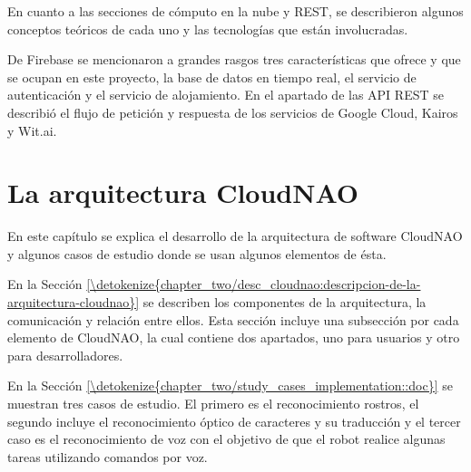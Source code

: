 \documentclass[letterpaper,12pt,spanish]{report}
\begin{document}
En cuanto a las secciones de cómputo en la nube
y REST, se describieron algunos conceptos teóricos
de cada uno y las tecnologías que están involucradas.

De Firebase se mencionaron a grandes rasgos 
tres características que ofrece y que se ocupan
en este proyecto, la base de datos en tiempo real,
el servicio de autenticación y el servicio de alojamiento.
En el apartado de las API REST se describió 
el flujo de petición y respuesta
de los servicios de Google Cloud, Kairos y Wit.ai.

\chapter{La arquitectura CloudNAO}
\label{\detokenize{chapter_two:la-arquitectura-cloudnao}}\label{\detokenize{chapter_two::doc}}

En este capítulo se explica el desarrollo de la arquitectura de software CloudNAO y algunos casos de estudio donde se usan
algunos elementos de ésta.

En la Sección \ref{\detokenize{chapter_two/desc_cloudnao:descripcion-de-la-arquitectura-cloudnao}} se describen los componentes de
la arquitectura, la comunicación y relación entre ellos.
Esta sección incluye una subsección por cada elemento de CloudNAO, la cual contiene dos apartados, uno para usuarios y otro para desarrolladores.

En la Sección \ref{\detokenize{chapter_two/study_cases_implementation::doc}} se muestran tres casos de estudio. El primero es el 
reconocimiento rostros, el segundo incluye el reconocimiento
óptico de caracteres y su traducción y el tercer caso es
el reconocimiento de voz con el objetivo de que
el robot realice algunas tareas utilizando comandos por voz.









\end{document}
